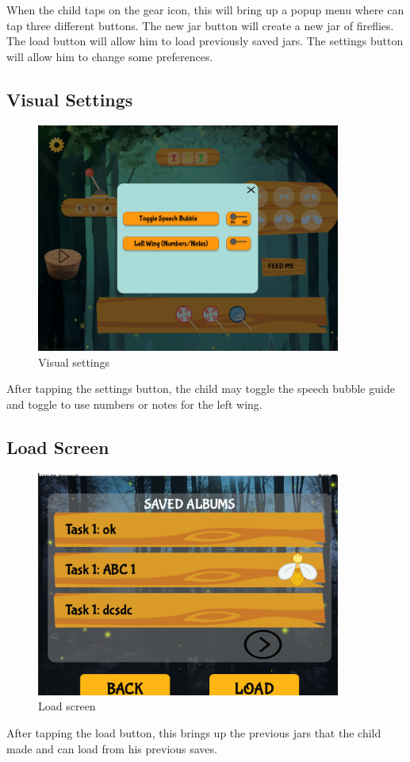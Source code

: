 When the child taps on the gear icon, this will bring up a popup menu where can tap three different buttons. The new jar button will create a new jar of fireflies. The load button will allow him to load previously saved jars. The settings button will allow him to change some preferences.

\subsection{Visual Settings}

\begin{figure}[H]
    \centering
    \includegraphics[width=10cm]{figures/newScreenFlows/newsettings.png}
    \caption{Visual settings}
    \label{fig:newvisettings}
\end{figure}

After tapping the settings button, the child may toggle the speech bubble guide and toggle to use numbers or notes for the left wing.

\subsection{Load Screen}

\begin{figure}[H]
    \centering
    \includegraphics[width=10cm]{figures/newScreenFlows/newload.png}
    \caption{Load screen}
    \label{fig:newload}
\end{figure}
After tapping the load button, this brings up the previous jars that the child made and can load from his previous saves.

